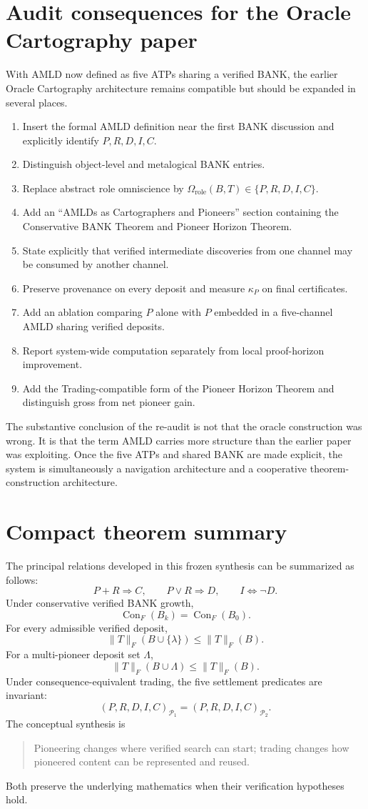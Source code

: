 \documentclass[11pt]{article}
\theoremstyle{remark}
\newcommand{\Con}{\operatorname{Con}}
\begin{document}
\section{Audit consequences for the Oracle Cartography paper}
With AMLD now defined as five ATPs sharing a verified BANK, the earlier Oracle Cartography architecture remains compatible but should be expanded in several places.
\begin{enumerate}
\item Insert the formal AMLD definition near the first BANK discussion and explicitly identify $P,R,D,I,C$.
\item Distinguish object-level and metalogical BANK entries.
\item Replace abstract role omniscience by $\Omega_{\mathrm{role}}(B,T)\in\{P,R,D,I,C\}$.
\item Add an ``AMLDs as Cartographers and Pioneers'' section containing the Conservative BANK Theorem and Pioneer Horizon Theorem.
\item State explicitly that verified intermediate discoveries from one channel may be consumed by another channel.
\item Preserve provenance on every deposit and measure $\kappa_P$ on final certificates.
\item Add an ablation comparing $P$ alone with $P$ embedded in a five-channel AMLD sharing verified deposits.
\item Report system-wide computation separately from local proof-horizon improvement.
\item Add the Trading-compatible form of the Pioneer Horizon Theorem and distinguish gross from net pioneer gain.
\end{enumerate}
The substantive conclusion of the re-audit is not that the oracle construction was wrong. It is that the term AMLD carries more structure than the earlier paper was exploiting. Once the five ATPs and shared BANK are made explicit, the system is simultaneously a navigation architecture and a cooperative theorem-construction architecture.

\section{Compact theorem summary}
The principal relations developed in this frozen synthesis can be summarized as follows:
\[
P+R\Rightarrow C,\qquad P\lor R\Rightarrow D,\qquad I\Longleftrightarrow\neg D.
\]
Under conservative verified BANK growth,
\[
\Con_F(B_k)=\Con_F(B_0).
\]
For every admissible verified deposit,
\[
\lVert T\rVert_F(B\cup\{\lambda\})\le\lVert T\rVert_F(B).
\]
For a multi-pioneer deposit set $\Lambda$,
\[
\lVert T\rVert_F(B\cup\Lambda)\le\lVert T\rVert_F(B).
\]
Under consequence-equivalent trading, the five settlement predicates are invariant:
\[
(P,R,D,I,C)_{\mathcal P_1}=(P,R,D,I,C)_{\mathcal P_2}.
\]
The conceptual synthesis is
\begin{quote}
Pioneering changes where verified search can start; trading changes how pioneered content can be represented and reused.
\end{quote}
Both preserve the underlying mathematics when their verification hypotheses hold.
\end{document}
